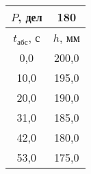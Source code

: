 \begin{tabular}[t]{|c|c|}
\hline
$P$, дел & 180 \\
\hline
$t_{абс}$, с & $h$, мм \\ 
\hline
0,0 & 200,0 \\ 
10,0 & 195,0 \\ 
20,0 & 190,0 \\ 
31,0 & 185,0 \\ 
42,0 & 180,0 \\ 
53,0 & 175,0 \\ 
\hline
\end{tabular}